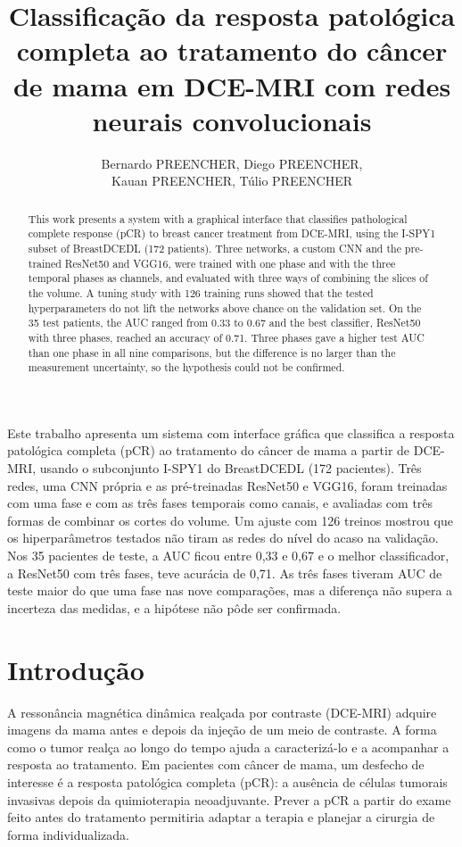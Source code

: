 \documentclass[12pt]{article}
\title{Classificação da resposta patológica completa ao tratamento do câncer de mama em DCE-MRI com redes neurais convolucionais}
\author{Bernardo PREENCHER\inst{1}, Diego PREENCHER\inst{1},\\
  Kauan PREENCHER\inst{1}, Túlio PREENCHER\inst{1}}
\begin{document}
\maketitle

\begin{abstract}
This work presents a system with a graphical interface that classifies pathological complete response
(pCR) to breast cancer treatment from DCE-MRI, using the I-SPY1 subset of BreastDCEDL (172 patients).
Three networks, a custom CNN and the pre-trained ResNet50 and VGG16, were trained with one phase and with
the three temporal phases as channels, and evaluated with three ways of combining the slices of the
volume. A tuning study with 126 training runs showed that the tested hyperparameters do not lift the
networks above chance on the validation set. On the 35 test patients, the AUC ranged from 0.33 to 0.67
and the best classifier, ResNet50 with three phases, reached an accuracy of 0.71. Three phases gave a
higher test AUC than one phase in all nine comparisons, but the difference is no larger than the
measurement uncertainty, so the hypothesis could not be confirmed.
\end{abstract}

\begin{resumo}
Este trabalho apresenta um sistema com interface gráfica que classifica a resposta patológica completa
(pCR) ao tratamento do câncer de mama a partir de DCE-MRI, usando o subconjunto I-SPY1 do BreastDCEDL
(172 pacientes). Três redes, uma CNN própria e as pré-treinadas ResNet50 e VGG16, foram treinadas com uma
fase e com as três fases temporais como canais, e avaliadas com três formas de combinar os cortes do
volume. Um ajuste com 126 treinos mostrou que os hiperparâmetros testados não tiram as redes do nível do
acaso na validação. Nos 35 pacientes de teste, a AUC ficou entre 0,33 e 0,67 e o melhor classificador, a
ResNet50 com três fases, teve acurácia de 0,71. As três fases tiveram AUC de teste maior do que uma fase
nas nove comparações, mas a diferença não supera a incerteza das medidas, e a hipótese não pôde ser
confirmada.
\end{resumo}

\section{Introdução}

A ressonância magnética dinâmica realçada por contraste (DCE-MRI) adquire imagens da mama antes e depois
da injeção de um meio de contraste. A forma como o tumor realça ao longo do tempo ajuda a caracterizá-lo e
a acompanhar a resposta ao tratamento. Em pacientes com câncer de mama, um desfecho de interesse é a
resposta patológica completa (pCR): a ausência de células tumorais invasivas depois da quimioterapia
neoadjuvante. Prever a pCR a partir do exame feito antes do tratamento permitiria adaptar a terapia e
planejar a cirurgia de forma individualizada.
\end{document}
